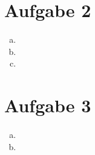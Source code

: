 \documentclass[a4paper]{scrartcl}
\begin{document}
\newpage
\section*{Aufgabe 2}
\begin{enumerate}[a)]
\item
\item
\item

\end{enumerate}

\newpage
\section*{Aufgabe 3}
\begin{enumerate}[a)]
\item
\item

\end{enumerate}
\end{document}

